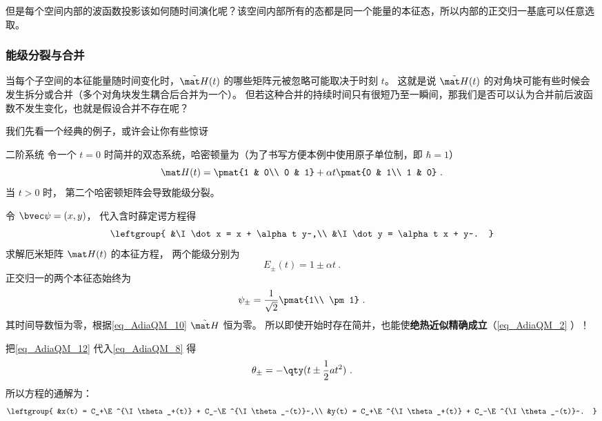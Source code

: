 但是每个空间内部的波函数投影该如何随时间演化呢？该空间内部所有的态都是同一个能量的本征态，所以内部的正交归一基底可以任意选取。

\subsubsection{能级分裂与合并}
当每个子空间的本征能量随时间变化时，$\tilde{\mat H}(t)$ 的哪些矩阵元被忽略可能取决于时刻 $t$。 这就是说 $\tilde{\mat H}(t)$ 的对角块可能有些时候会发生拆分或合并（多个对角块发生耦合后合并为一个）。 但若这种合并的持续时间只有很短乃至一瞬间，那我们是否可以认为合并前后波函数不发生变化，也就是假设合并不存在呢？

我们先看一个经典的例子，或许会让你有些惊讶
\begin{example}{二阶系统}
令一个 $t=0$ 时简并的双态系统，哈密顿量为（为了书写方便本例中使用原子单位制，即 $\hbar=1$）
\begin{equation}
\mat H(t) = \pmat{1 & 0\\ 0 & 1}
+ \alpha t \pmat{0 & 1\\ 1 & 0}~.
\end{equation}
当 $t>0$ 时， 第二个哈密顿矩阵会导致能级分裂。

令 $\bvec\psi = (x,y)$， 代入含时薛定谔方程得
\begin{equation}
\leftgroup{
&\I\dot x = x + \alpha t y~,\\
&\I\dot y = \alpha t x + y~.
}\end{equation}
求解厄米矩阵 $\mat H(t)$ 的本征方程， 两个能级分别为
\begin{equation}\label{eq_AdiaQM_12}
E_\pm(t) = 1 \pm \alpha t~.
\end{equation}
正交归一的两个本征态始终为
\begin{equation}
\psi_\pm = \frac{1}{\sqrt{2}}\pmat{1\\ \pm1}~.
\end{equation}
其时间导数恒为零，根据\autoref{eq_AdiaQM_10} $\tilde{\mat H}$ 恒为零。 所以即使开始时存在简并，也能使\textbf{绝热近似精确成立}（\autoref{eq_AdiaQM_2} ）！

把\autoref{eq_AdiaQM_12} 代入\autoref{eq_AdiaQM_8} 得
\begin{equation}
\theta_\pm = -\qty(t \pm \frac{1}{2}at^2)~.
\end{equation}
所以方程的通解为：
\begin{equation}
\leftgroup{
&x(t) = C_+\E^{\I\theta_+(t)} + C_-\E^{\I\theta_-(t)}~,\\
&y(t) = C_+\E^{\I\theta_+(t)} + C_-\E^{\I\theta_-(t)}~.
}\end{equation}
\end{example}

